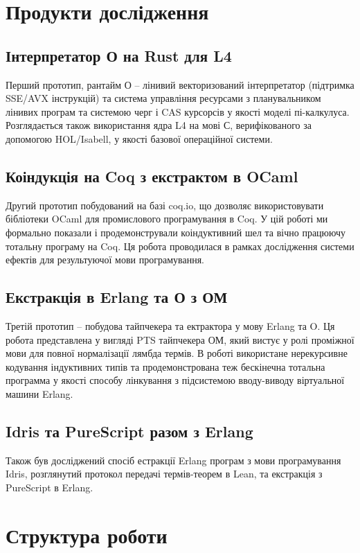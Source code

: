 \newpage
\section{Продукти дослідження}

\subsection{Інтерпретатор О на Rust для L4}
Перший прототип, рантайм О -- лінивий
векторизований інтерпретатор (підтримка SSE/AVX інструкцій) та система
управління ресурсами з планувальником лінивих програм
та системою черг і CAS курсорсів у якості моделі пі-калкулуса. Розглядається також
використання ядра L4 на мові С, верифікованого за допомогою HOL/Isabell,
у якості базової операційної системи.

\subsection{Коіндукція на Coq з екстрактом в OCaml}
Другий прототип побудований на базі coq.io, що дозволяє
використовувати бібліотеки OCaml для промислового програмування в Coq.
У цій роботі ми формально показали і продемонстрували коіндуктивний шел
та вічно працюючу тотальну програму на Coq. Ця робота проводилася
в рамках дослідження системи ефектів для результуючої мови програмування.

\subsection{Екстракція в Erlang та О з ОМ}
Третій прототип -- побудова тайпчекера та ектрактора у мову Erlang та O.
Ця робота представлена у вигляді PTS тайпчекера ОМ, який вистує у ролі
проміжної мови для повної нормалізації лямбда термів. В роботі використане
нерекурсивне кодування індуктивних типів та продемонстрована теж бескінечна
тотальна программа у якості способу лінкування з підсистемою вводу-виводу
віртуальної машини Erlang.

\subsection*{Idris та PureScript разом з Erlang}
Також був досліджений спосіб естракції Erlang програм з мови програмування
Idris, розглянутий протокол передачі термів-теорем в Lean,
та екстракція з PureScript в Erlang.


\newpage
\section{Структура роботи}

